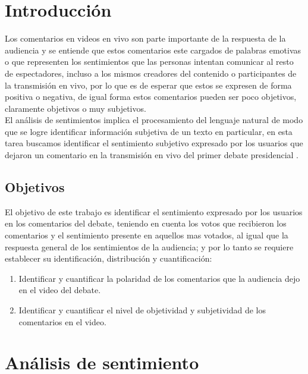 \chapter{Introducción}

Los comentarios en videos en vivo son parte importante de la respuesta de la audiencia y se entiende que estos comentarios este cargados de palabras emotivas o que representen los sentimientos que las personas intentan comunicar al resto de espectadores, incluso a los mismos creadores del contenido o participantes de la transmisión en vivo, por lo que es de esperar que estos se expresen de forma positiva o negativa, de igual forma estos comentarios pueden ser poco objetivos, claramente objetivos o muy subjetivos\cite{steven2024}.\\

El análisis de sentimientos implica el procesamiento del lenguaje natural de modo que se logre identificar información subjetiva de un texto en particular, en esta tarea buscamos identificar el sentimiento subjetivo expresado por los usuarios que dejaron un comentario en la transmisión en vivo del primer debate presidencial \cite{quiroga2016}\cite{steven2024}.\\

\section{Objetivos}
El objetivo de este trabajo es identificar el sentimiento expresado por los usuarios en los comentarios del debate, teniendo en cuenta los votos que recibieron los comentarios y el sentimiento presente en aquellos mas votados, al igual que la respuesta general de los sentimientos de la audiencia; y por lo tanto  se requiere establecer su identificación, distribución y cuantificación:\\

\begin{enumerate}
	\item Identificar y cuantificar la polaridad de los comentarios que la audiencia dejo en el video del debate.\\
	
	\item Identificar y cuantificar el nivel de objetividad y subjetividad de los comentarios en el video.\\
\end{enumerate}


\chapter{Análisis de sentimiento}

